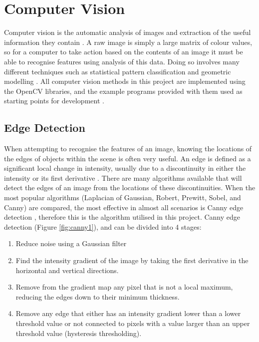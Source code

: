 \section{Computer Vision}

Computer vision is the automatic analysis of images and extraction of the useful information they contain \cite{CVDef}. A raw image is simply a large matrix of colour values, so for a computer to take action based on the contents of an image it must be able to recognise features using analysis of this data. Doing so involves many different techniques such as statistical pattern classification and geometric modelling \cite{ballard1982computer}. All computer vision methods in this project are implemented using the OpenCV libraries, and the example programs provided with them used as starting points for development \cite{OpenCV}.

\subsection{Edge Detection}
When attempting to recognise the features of an image, knowing the locations of the edges of objects within the scene is often very useful. An edge is defined as a significant local change in intensity, usually due to a discontinuity in either the intensity or its first derivative \cite{jain1995machine}. There are many algorithms available that will detect the edges of an image from the locations of these discontinuities. When the most popular algorithms (Laplacian of Gaussian, Robert, Prewitt, Sobel, and Canny) are compared, the most effective in almost all scenarios is Canny edge detection \cite{maini2009study}, therefore this is the algorithm utilised in this project. Canny edge detection \cite{canny1986computational} (Figure \ref{fig:canny1}), and can be divided into 4 stages:
\begin{enumerate}
    \item Reduce noise using a Gaussian filter
    \item Find the intensity gradient of the image by taking the first derivative in the horizontal and vertical directions.
    \item Remove from the gradient map any pixel that is not a local maximum, reducing the edges down to their minimum thickness.
    \item Remove any edge that either has an intensity gradient lower than a lower threshold value or not connected to pixels with a value larger than an upper threshold value (hysteresis thresholding).
\end{enumerate}

